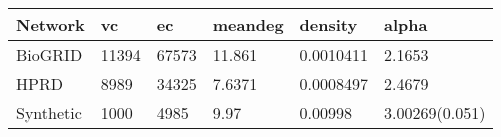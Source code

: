 
\begin{tabular}{l|l|l|l|l|l}
\hline
Network & vc & ec & meandeg & density & alpha\\
\hline
BioGRID & 11394 & 67573 & 11.861 & 0.0010411 & 2.1653\\
\hline
HPRD & 8989 & 34325 & 7.6371 & 0.0008497 & 2.4679\\
\hline
Synthetic & 1000 & 4985 & 9.97 & 0.00998 & 3.00269(0.051)\\
\hline
\end{tabular}

